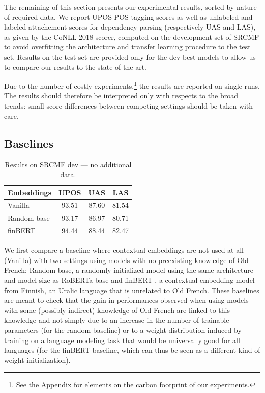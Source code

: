 The remaining of this section presents our experimental results, sorted by nature of required data.
We report UPOS POS-tagging scores as well as unlabeled and labeled attachement scores for dependency parsing (respectively UAS and LAS), as given by the CoNLL-2018 scorer, computed on the development set of SRCMF to avoid overfitting the architecture and transfer learning procedure to the test set.
Results on the test set are provided only for the dev-best models to allow us to compare our results to the state of the art.

Due to the number of costly experiments,\footnote{See the Appendix for elements on the carbon footprint of our experiments.} the results are reported on single runs.
The results should therefore be interpreted  only with respects to the broad trends: small score differences between competing settings should be taken with care.

\subsection{Baselines}\label{sec|baselines}
\begin{table}[thb]
    \centering
    \tablefontsize
    \begin{tabular}{l*{3}{S[table-format=2.2]}}
        \toprule
        {\textbf{Embeddings}} & {\textbf{UPOS}} & {\textbf{UAS}} & {\textbf{LAS}}\\
        \midrule
        Vanilla & 93.51 & 87.60 & 81.54\\
        Random-base & 93.17 & 86.97 & 80.71\\
        finBERT   & 94.44 & 88.44 & 82.47\\
        \bottomrule
    \end{tabular}
    \caption{Results on SRCMF dev — no additional data.}\label{tab|nodata}
\end{table}

We first compare a baseline where contextual embeddings are not used at all (Vanilla) with two settings using models with no preexisting knowledge of Old French: Random-base, a randomly initialized model using the same architecture and model size as RoBERTa-base \citep{liu2019RoBERTaRobustlyOptimized} %
and finBERT \citep{virtanen2019MultilingualNotEnough}, a contextual embedding model from Finnish, an Uralic language that is unrelated to Old French.
These baselines are meant to check that the gain in performances observed when using models with some (possibly indirect) knowledge of Old French are linked to this knowledge and not simply due to an increase in the number of trainable parameters (for the random baseline) or to a weight distribution induced by training on a language modeling task that would be universally good for all languages (for the finBERT baseline, which can thus be seen as a different kind of weight initialization).

